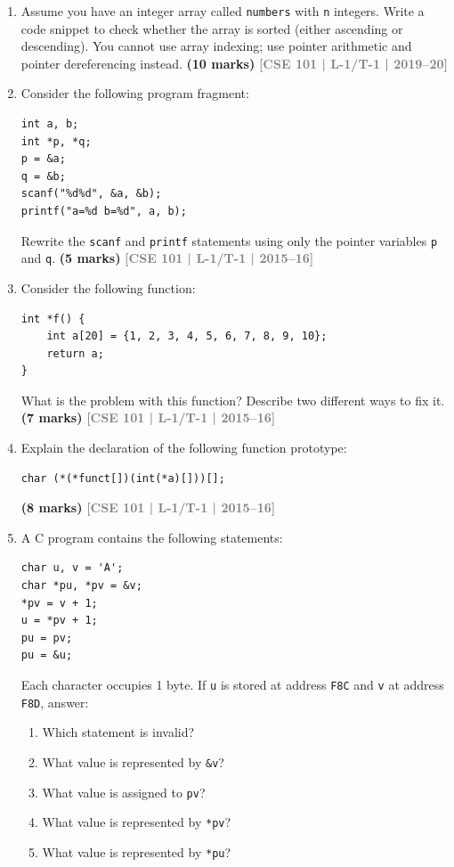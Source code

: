 \documentclass[12pt,a3paper]{article}
\newcommand{\yr}[1]{\hfill\textcolor{gray}{\small\textbf{[#1]}}}
\newcommand{\mk}[1]{\textcolor{orange!70!black}{\small\textbf{(#1 marks)}}}
\begin{document}
\begin{enumerate}
\item Assume you have an integer array called \texttt{numbers} with \texttt{n} integers. Write a code snippet to check whether the array is sorted (either ascending or descending). You cannot use array indexing; use pointer arithmetic and pointer dereferencing instead.
\mk{10} \yr{CSE 101 | L-1/T-1 | 2019--20}

\item Consider the following program fragment:
 
\begin{lstlisting}
int a, b;
int *p, *q;
p = &a;
q = &b;
scanf("%d%d", &a, &b);
printf("a=%d b=%d", a, b);
\end{lstlisting}
Rewrite the \texttt{scanf} and \texttt{printf} statements using only the pointer variables \texttt{p} and \texttt{q}.
\mk{5} \yr{CSE 101 | L-1/T-1 | 2015--16}

\item Consider the following function:
 
\begin{lstlisting}
int *f() {
    int a[20] = {1, 2, 3, 4, 5, 6, 7, 8, 9, 10};
    return a;
}
\end{lstlisting}
What is the problem with this function? Describe two different ways to fix it.
\mk{7} \yr{CSE 101 | L-1/T-1 | 2015--16}

\item Explain the declaration of the following function prototype:
\begin{lstlisting}
char (*(*funct[])(int(*a)[]))[];
\end{lstlisting}
\mk{8} \yr{CSE 101 | L-1/T-1 | 2015--16}

\item A C program contains the following statements:
\begin{lstlisting}
char u, v = 'A';
char *pu, *pv = &v;
*pv = v + 1;
u = *pv + 1;
pu = pv;
pu = &u;
\end{lstlisting}
Each character occupies 1 byte. If \texttt{u} is stored at address \texttt{F8C} and \texttt{v} at address \texttt{F8D}, answer:
\begin{enumerate}
  \item Which statement is invalid?
  \item What value is represented by \texttt{\&v}?
  \item What value is assigned to \texttt{pv}?
  \item What value is represented by \texttt{*pv}?
  \item What value is represented by \texttt{*pu}?
\end{enumerate}
 

\end{enumerate}
\end{document}
